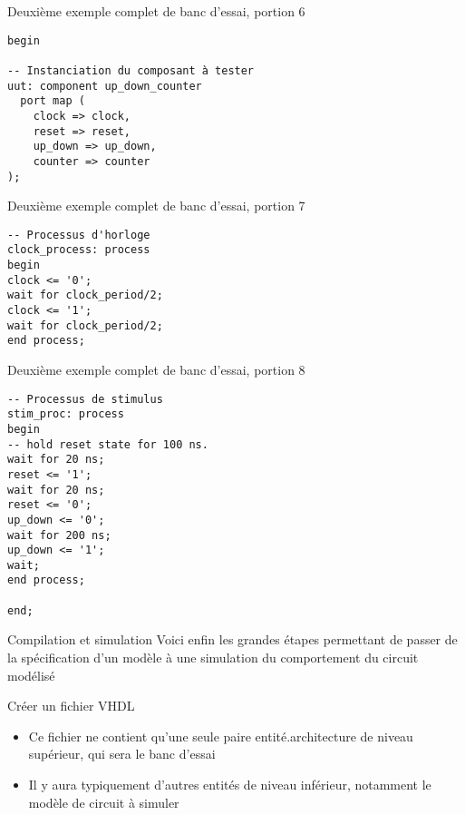 \documentclass[presentation]{beamer}
\begin{document}
\begin{frame}[label={sec:org4367238},fragile]{Deuxième exemple complet de banc d'essai, portion 6}
 \begin{verbatim}
begin

-- Instanciation du composant à tester
uut: component up_down_counter
  port map (
    clock => clock,
    reset => reset,
    up_down => up_down,
    counter => counter
);
\end{verbatim}
\end{frame}

\begin{frame}[label={sec:org4fe32a1},fragile]{Deuxième exemple complet de banc d'essai, portion 7}
 \begin{verbatim}
-- Processus d'horloge
clock_process: process
begin
clock <= '0';
wait for clock_period/2;
clock <= '1';
wait for clock_period/2;
end process;
\end{verbatim}
\end{frame}

\begin{frame}[label={sec:org7d4d946},fragile]{Deuxième exemple complet de banc d'essai, portion 8}
 \begin{verbatim}
-- Processus de stimulus
stim_proc: process
begin
-- hold reset state for 100 ns.
wait for 20 ns;
reset <= '1';
wait for 20 ns;
reset <= '0';
up_down <= '0';
wait for 200 ns;
up_down <= '1';
wait;
end process;

end;
\end{verbatim}
\end{frame}

\begin{frame}[label={sec:orgbe1f716}]{Compilation et simulation}
Voici enfin les grandes étapes permettant de passer de la spécification d'un modèle à une simulation du comportement du circuit modélisé
\end{frame}

\begin{frame}[label={sec:orge1d9ffd}]{Créer un fichier VHDL}
\begin{itemize}
\item Ce fichier ne contient qu'une seule paire entité.architecture de niveau supérieur, qui sera le banc d'essai
\item Il y aura typiquement d'autres entités de niveau inférieur, notamment le modèle de circuit à simuler
\end{itemize}
\end{frame}
\end{document}
